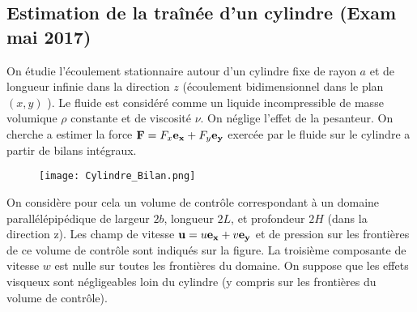 \subsection{Estimation de la traînée d'un cylindre (Exam mai 2017)}


On étudie l'écoulement stationnaire autour d'un cylindre fixe de rayon $a$ et de longueur infinie dans la direction $z$ (écoulement bidimensionnel dans le plan $(x,y)$ ). 
Le fluide est considéré comme un liquide incompressible de masse volumique $\rho$ constante et de viscosité $\nu$. On néglige l'effet de la pesanteur.
On cherche a estimer la force 
${\bf F} = F_x {\bf e_x} + F_y {\bf e_y} $ exercée par le fluide sur le cylindre a partir de bilans intégraux.



\begin{figure}[htb]
  \begin{center}
      \texttt{[image: Cylindre\_Bilan.png]}
      \end{center}
      \vspace{-1cm}
\end{figure}


 On considère pour cela un volume de contrôle correspondant à un domaine parallélépipédique 
 de largeur $2b$, longueur $2L$, et profondeur $2H$ (dans la direction z).  Les champ de vitesse ${\bf u} = u {\bf e_x} + v {\bf e_y} $  et de pression sur les frontières de ce volume de contrôle sont indiqués sur la figure. %
 La troisième composante de vitesse $w$ est nulle sur toutes les frontières du domaine.
 On suppose que les effets visqueux sont négligeables loin du cylindre (y compris sur les frontières du volume de contrôle).

